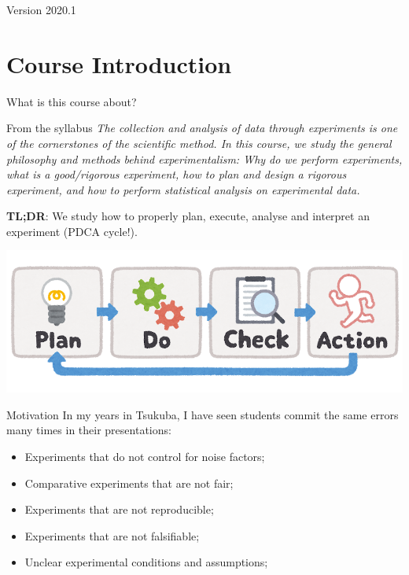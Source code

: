 \documentclass{beamer}
\subtitle[Intro]{Topic 00 - Course Introduction}
\begin{document}
\begin{CJK}{UTF8}{ipxm}


\begin{frame}
  \maketitle

  \vfill

  \hfill Version 2020.1
\end{frame}

\section{Course Introduction}
\begin{frame}{What is this course about?}

  \begin{block}{From the syllabus}
  \emph{The collection and analysis of data through experiments is one of the cornerstones of the scientific method. In this course, we study the general philosophy and methods behind experimentalism: Why do we perform experiments, what is a good/rigorous experiment, how to plan and design a rigorous experiment, and how to perform statistical analysis on experimental data.}
  \end{block}

  {\bf TL;DR}: We study how to properly plan, execute, analyse and interpret an experiment (PDCA cycle!).
  \begin{center}
    \includegraphics[width=.6\textwidth]{../img/irasutoya_pdca}
  \end{center}
\end{frame}

\begin{frame}{Motivation}
  In my years in Tsukuba, I have seen students commit the same errors many times in their presentations:
  \bigskip

  \begin{itemize}
    \item Experiments that do not control for noise factors;
    \item Comparative experiments that are not fair;
    \item Experiments that are not reproducible;
    \item Experiments that are not falsifiable;
    \item Unclear experimental conditions and assumptions;
  \end{itemize}
  \bigskip


\end{frame}
\end{CJK}
\end{document}
